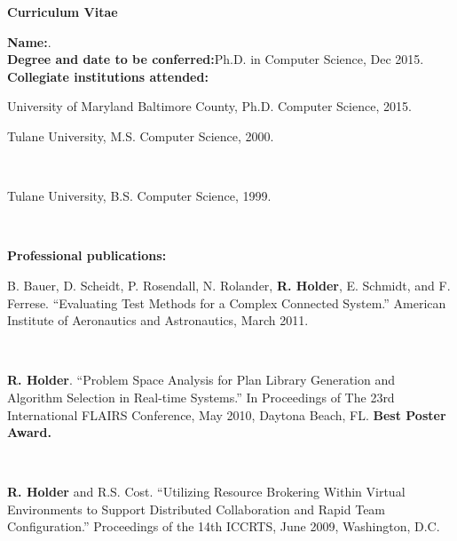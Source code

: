 \begin{titlepage}

\begin{center}
\vspace{0.1in}
\large{\bf Curriculum Vitae}
\bigskip \bigskip
\end{center}

\begin{flushleft}
  {\bf Name:}{\hspace{3mm}}\fullname{}.\\
	{\bf Degree and date to be conferred:}{\hspace{3mm}}Ph.D. in Computer Science, Dec 2015. \\
	{\bf Collegiate institutions attended:}\\
	\begin{singlespace} 
	{\hspace{0.4in}}University of Maryland Baltimore County, Ph.D. Computer Science, 2015. \\
	{\hspace{0.4in}}\parbox[t]{5.5in}{Tulane University, M.S. Computer Science, 2000.} \\
        {\hspace{0.4in}}\parbox[t]{5.5in}{Tulane University, B.S. Computer Science, 1999.} \\
	\end{singlespace} 
	\vspace{8pt}
	{\bf Professional publications:}\\
	\begin{singlespace} 
{\hspace{0.4in}} \parbox[t]{5.5in}{B. Bauer, D. Scheidt, P. Rosendall, N. Rolander, \textbf{R. Holder}, E. Schmidt, and F. Ferrese.  ``Evaluating Test Methods for a Complex Connected System.''  American Institute of Aeronautics and Astronautics, March 2011.}\\
{\vspace{5pt}}

{\hspace{0.4in}} \parbox[t]{5.5in}{\textbf{R. Holder}.  ``Problem Space Analysis for Plan Library Generation and Algorithm Selection in
Real-time Systems.'' In Proceedings of The 23rd International FLAIRS Conference, May 2010, Daytona Beach, FL.  \textbf{Best Poster Award.}}\\
{\vspace{5pt}}

{\hspace{0.4in}} \parbox[t]{5.5in}{\textbf{R. Holder} and R.S. Cost.  ``Utilizing Resource Brokering Within Virtual Environments to Support Distributed Collaboration and Rapid Team Configuration.'' Proceedings of the 14th ICCRTS, June 2009, Washington, D.C.}\\
{\vspace{5pt}}


\end{singlespace}
\end{flushleft}
\end{titlepage}
